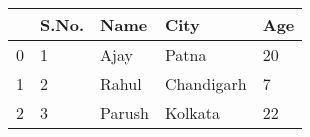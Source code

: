 \begin{tabular}{lllll}
\toprule
{} & S.No. &    Name &        City & Age \\
\midrule
0 &     1 &    Ajay &       Patna &  20 \\
1 &     2 &   Rahul &  Chandigarh &   7 \\
2 &     3 &  Parush &     Kolkata &  22 \\
\bottomrule
\end{tabular}
